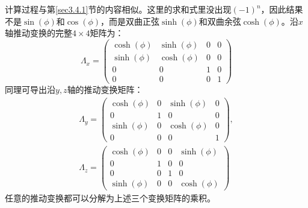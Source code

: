 计算过程与第\ref{sec3.4.1}节的内容相似。这里的求和式里没出现$(-1)^n$，因此结果不是$\sin(\phi)$和$\cos (\phi)$，而是双曲正弦$\sinh(\phi)$和双曲余弦$\cosh(\phi)$。沿$x$轴推动变换的完整$4 \times 4$矩阵为：
\begin{equation}
\label{equ3.144}
	\Lambda_x =
		\begin{pmatrix}
			\cosh(\phi) & \sinh(\phi) & 0 & 0 \\
			\sinh(\phi) & \cosh(\phi) & 0 & 0 \\
			0 & 0 & 1 & 0 \\
			0 & 0 & 0 & 1
		\end{pmatrix}
\end{equation}
同理可导出沿$y, z$轴的推动变换矩阵：
\begin{align}
\label{equ3.145}
	\Lambda_y =
		\begin{pmatrix}
			\cosh(\phi) & 0 & \sinh(\phi) & 0 \\
			0 & 1 & 0 & 0 \\
			\sinh(\phi) & 0 & \cosh(\phi) & 0 \\
			0 & 0 & 0 & 1
		\end{pmatrix}
	, \\
\label{equ3.146}
	\Lambda_z =
		\begin{pmatrix}
			\cosh(\phi) & 0 & 0 & \sinh(\phi) \\
			0 & 1 & 0 & 0 \\
			0 & 0 & 1 & 0 \\
			\sinh(\phi) & 0 & 0 & \cosh(\phi)
		\end{pmatrix}
\end{align}
任意的推动变换都可以分解为上述三个变换矩阵的乘积。


